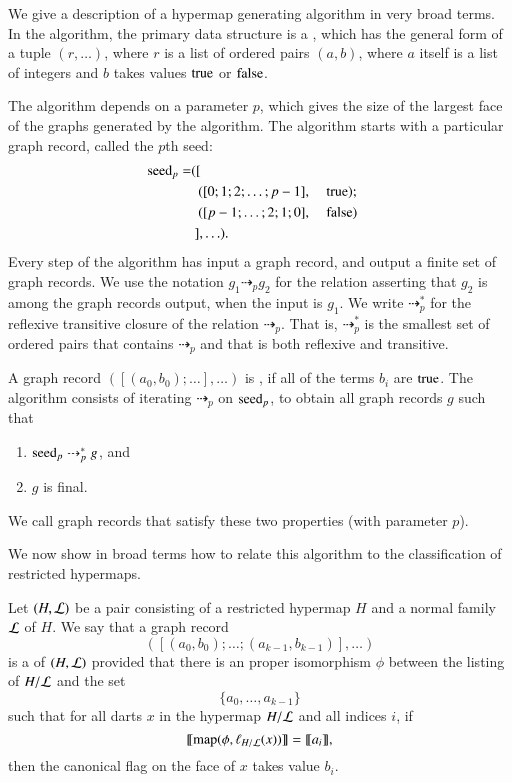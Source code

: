 \bigskip

We give a description of a hypermap generating algorithm in very
broad terms.  In the algorithm, the primary data structure is a
, which has the general form of a tuple
$(r,\ldots)$, where $r$ is a list of ordered pairs $(a,b)$, where
$a$ itself is a list of integers and $b$ takes values ${\operatorname{true}}$ or
${\operatorname{false}}$.


The algorithm depends on a parameter $p$, which gives the size of the
largest face of the graphs generated by the algorithm.  The algorithm
starts with a particular graph record, called the $p$th seed:
\begin{alignat*}{4}
{\operatorname{seed}}_p =
&(
[   \\
 &~~([0;1;2;\ldots;p-1],&&~{\operatorname{true}}); \\
 &~~([p-1;\ldots;2;1;0],&&~{\operatorname{false}}) \\
 &~],\ldots).
\end{alignat*}
Every step of the algorithm has input a graph record, and output a
finite set of graph records.  We use the notation $g_1
\dashrightarrow_p g_2$ for the relation asserting that $g_2$ is among
the graph records output, when the input is $g_1$.  We write
$\dashrightarrow_p^*$ for the reflexive transitive closure of the
relation $\dashrightarrow_p$.  That is, $\dashrightarrow_p^*$ is the
smallest set of ordered pairs that contains $\dashrightarrow_p$ and
that is both reflexive and transitive.

A graph record $([(a_0,b_0);\ldots],\ldots)$ is , if all of
the terms $b_i$ are ${\operatorname{true}}$.  
The algorithm consists of iterating $\dashrightarrow_p$ on  ${\operatorname{seed}}_p$,
to obtain all graph records $g$ such that
\begin{enumerate}
\item ${\operatorname{seed}}_p \dashrightarrow_p^* g$, and
\item $g$ is final.
\end{enumerate}
We call  graph records that satisfy these two properties
 (with parameter $p$).
%
%
%

We now show in broad terms how to relate this algorithm to the
classification of restricted hypermaps.

\begin{definition}[record]
  Let $(H,{\cal L})$ be a pair consisting of a restricted hypermap $H$
  and a normal family ${\cal L}$ of $H$.  We say that a graph record
\[
([(a_0,b_0);\ldots;(a_{k-1},b_{k-1})],\ldots)
\]
is a  of $(H,{\cal L})$ provided that there is an
proper isomorphism $\phi$ between the listing of $H/{\cal L}$ and the
set
\[
\{a_0,\ldots,a_{k-1}\}
\]
such that for all darts $x$ in the hypermap $H/{\cal L}$ and all
indices $i$, if
\[
{\llbracket{{\operatorname{map}}(\phi,\ell_{H/{\cal L}}(x))}\rrbracket} = {\llbracket{a_i}\rrbracket},
\]
then the canonical flag on the face of $x$ takes value $b_i$.
\end{definition}


